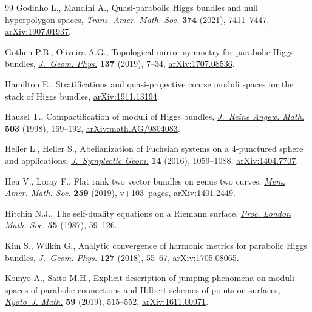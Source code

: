 \begin{thebibliography}{99}
Godinho L., Mandini A., Quasi-parabolic {H}iggs bundles and null hyperpolygon
 spaces, \href{https://doi.org/10.1090/tran/8450}{\textit{Trans. Amer. Math. Soc.}} \textbf{374} (2021), 7411--7447,
 \href{https://arxiv.org/abs/1907.01937}{arXiv:1907.01937}.

Gothen P.B., Oliveira A.G., Topological mirror symmetry for parabolic {H}iggs
 bundles, \href{https://doi.org/10.1016/j.geomphys.2018.08.020}{\textit{J.~Geom. Phys.}} \textbf{137} (2019), 7--34,
 \href{https://arxiv.org/abs/1707.08536}{arXiv:1707.08536}.

Hamilton E., Stratifications and quasi-projective coarse moduli spaces for the
 stack of {H}iggs bundles, \href{https://arxiv.org/abs/1911.13194}{arXiv:1911.13194}.

Hausel T., Compactification of moduli of {H}iggs bundles, \href{https://doi.org/10.1515/crll.1998.096}{\textit{J.~Reine
 Angew. Math.}} \textbf{503} (1998), 169--192, \href{https://arxiv.org/abs/math.AG/9804083}{arXiv:math.AG/9804083}.

Heller L., Heller S., Abelianization of {F}uchsian systems on a 4-punctured
 sphere and applications, \href{https://doi.org/10.4310/JSG.2016.v14.n4.a4}{\textit{J.~Symplectic Geom.}} \textbf{14} (2016),
 1059--1088, \href{https://arxiv.org/abs/1404.7707}{arXiv:1404.7707}.

Heu V., Loray F., Flat rank two vector bundles on genus two curves,
 \href{https://doi.org/10.1090/memo/1247}{\textit{Mem. Amer. Math. Soc.}} \textbf{259} (2019), v+103~pages,
 \href{https://arxiv.org/abs/1401.2449}{arXiv:1401.2449}.

Hitchin N.J., The self-duality equations on a {R}iemann surface, \href{https://doi.org/10.1112/plms/s3-55.1.59}{\textit{Proc.
 London Math. Soc.}} \textbf{55} (1987), 59--126.

Kim S., Wilkin G., Analytic convergence of harmonic metrics for parabolic
 {H}iggs bundles, \href{https://doi.org/10.1016/j.geomphys.2018.01.023}{\textit{J.~Geom. Phys.}} \textbf{127} (2018), 55--67,
 \href{https://arxiv.org/abs/1705.08065}{arXiv:1705.08065}.

Komyo A., Saito M.H., Explicit description of jumping phenomena on moduli
 spaces of parabolic connections and {H}ilbert schemes of points on surfaces,
 \href{https://doi.org/10.1215/21562261-2019-0016}{\textit{Kyoto~J. Math.}} \textbf{59} (2019), 515--552, \href{https://arxiv.org/abs/1611.00971}{arXiv:1611.00971}.


\end{thebibliography}
